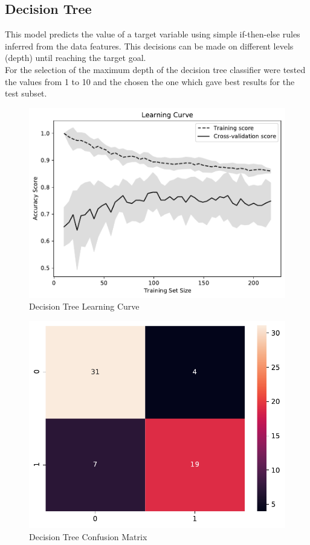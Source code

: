 \documentclass[conference]{IEEEtran}
\begin{document}
\subsection{Decision Tree}
This model predicts the value of a target variable using simple if-then-else rules inferred from the data features. This decisions can be made on different levels (depth) until reaching the target goal.
\\For the selection of the maximum depth of the decision tree classifier were tested the values from 1 to 10 and the chosen the one which gave best results for the test subset.

\begin{figure}[H]
    \centerline{\includegraphics[width=0.9\linewidth]{images/DecisionTreeClassifier_lc.pdf}}
    \caption{Decision Tree Learning Curve}
    \label{dt_lc}
\end{figure}

\noindent


\begin{figure}[H]
    \centerline{\includegraphics[width=0.8\linewidth]{images/decision_tree_cm.pdf}}
    \caption{Decision Tree Confusion Matrix}
    \label{dt_cm}
\end{figure}
\end{document}
